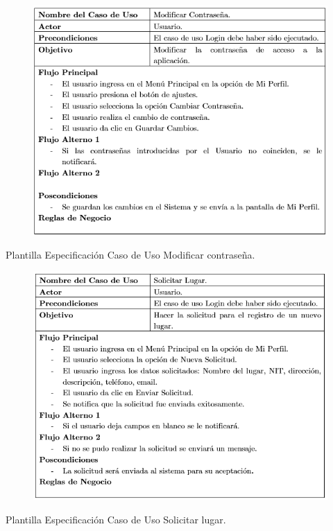 \documentclass[12pt,letterpaper,openany]{book}
\begin{document}
\begin{table}[H]
\begin{center}
\begin{figure}[H]
\begin{center}
\includegraphics[width=13cm]{./imagenes/PCU/modificar_contrasena}
\end{center}
\end{figure}
\end{center}
\caption{Plantilla Especificación Caso de Uso Modificar contraseña.}
\end{table}

\begin{table}[H]
\begin{center}
\begin{figure}[H]
\begin{center}
\includegraphics[width=13cm]{./imagenes/PCU/solicitar_lugar}
\end{center}
\end{figure}
\end{center}
\caption{Plantilla Especificación Caso de Uso Solicitar lugar.}
\end{table}
\end{document}
